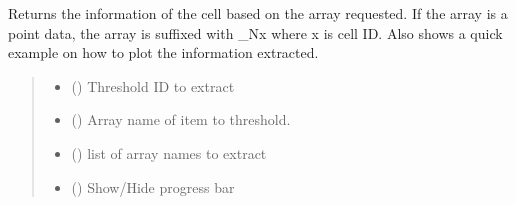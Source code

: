 \documentclass[letterpaper,10pt,english]{sphinxmanual}
\begin{document}
\begin{fulllineitems}
\begin{fulllineitems}
\begin{quote}
\begin{description}
\end{description}\end{quote}

\end{fulllineitems}


\begin{fulllineitems}
\label{\detokenize{openfdem:openfdem.openfdem.Model.extract_threshold_info}}
\pysigstartsignatures
{}
\pysigstopsignatures
\sphinxAtStartPar
Returns the information of the cell based on the array requested.
If the array is a point data, the array is suffixed with \_Nx where x is cell ID.
Also shows a quick example on how to plot the information extracted.
\begin{quote}\begin{description}
\begin{itemize}
\item {} 
\sphinxAtStartPar
{} () \textendash{} Threshold ID to extract

\item {} 
\sphinxAtStartPar
{} () \textendash{} Array name of item to threshold.

\item {} 
\sphinxAtStartPar
{} (\sphinxstyleliteralemphasis{\sphinxupquote{{[}}}\sphinxstyleliteralemphasis{\sphinxupquote{{]}}}) \textendash{} list of array names to extract

\item {} 
\sphinxAtStartPar
{} () \textendash{} Show/Hide progress bar


\end{itemize}
\end{description}
\end{quote}
\end{fulllineitems}
\end{fulllineitems}
\end{document}
